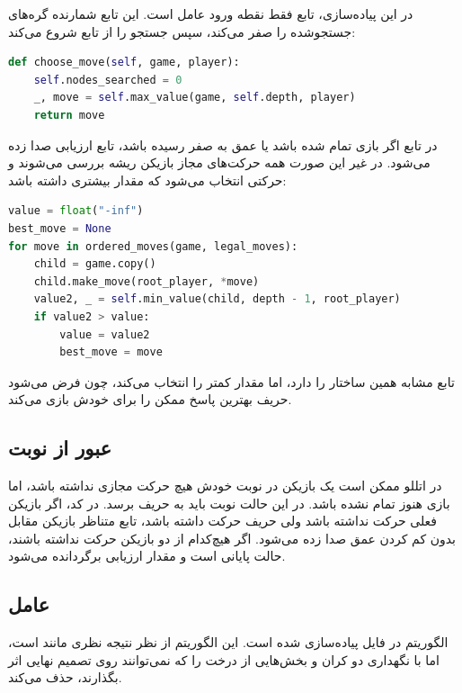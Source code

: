 \documentclass[10.5pt]{exam}
\begin{document}
در این پیاده‌سازی، تابع
فقط نقطه ورود عامل است. این تابع شمارنده گره‌های جستجوشده را صفر می‌کند، سپس جستجو را از تابع
شروع می‌کند:

\begin{latin}
\begin{lstlisting}[language=Python]
def choose_move(self, game, player):
    self.nodes_searched = 0
    _, move = self.max_value(game, self.depth, player)
    return move
\end{lstlisting}
\end{latin}

در تابع
اگر بازی تمام شده باشد یا عمق به صفر رسیده باشد، تابع ارزیابی صدا زده می‌شود. در غیر این صورت همه حرکت‌های مجاز بازیکن ریشه بررسی می‌شوند و حرکتی انتخاب می‌شود که مقدار بیشتری داشته باشد:

\begin{latin}
\begin{lstlisting}[language=Python]
value = float("-inf")
best_move = None
for move in ordered_moves(game, legal_moves):
    child = game.copy()
    child.make_move(root_player, *move)
    value2, _ = self.min_value(child, depth - 1, root_player)
    if value2 > value:
        value = value2
        best_move = move
\end{lstlisting}
\end{latin}

تابع
مشابه همین ساختار را دارد، اما مقدار کمتر را انتخاب می‌کند، چون فرض می‌شود حریف بهترین پاسخ ممکن را برای خودش بازی می‌کند.

\subsection{عبور از نوبت}
در اتللو ممکن است یک بازیکن در نوبت خودش هیچ حرکت مجازی نداشته باشد، اما بازی هنوز تمام نشده باشد. در این حالت نوبت باید به حریف برسد. در کد، اگر بازیکن فعلی حرکت نداشته باشد ولی حریف حرکت داشته باشد، تابع متناظر بازیکن مقابل بدون کم کردن عمق صدا زده می‌شود. اگر هیچ‌کدام از دو بازیکن حرکت نداشته باشند، حالت پایانی است و مقدار ارزیابی برگردانده می‌شود.

\subsection{عامل }
الگوریتم
در فایل
پیاده‌سازی شده است. این الگوریتم از نظر نتیجه نظری مانند
است، اما با نگهداری دو کران
و
بخش‌هایی از درخت را که نمی‌توانند روی تصمیم نهایی اثر بگذارند، حذف می‌کند.
\end{document}
